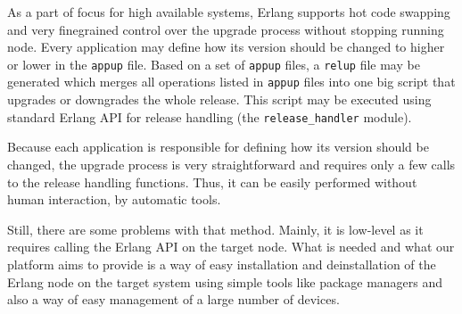 As a part of focus for high available systems, Erlang supports hot code swapping and
very finegrained control over the upgrade process without stopping running node.
Every application may define how its version should be changed to higher or lower in the
{\tt appup} file. Based on a set of {\tt appup} files, a {\tt relup} file may be generated
which merges all operations listed in {\tt appup} files into one big script that
upgrades or downgrades the whole release. This script may be executed using standard Erlang
API for release handling (the {\tt release\_handler} module).

Because each application is responsible
for defining how its version should be changed, the upgrade process is very straightforward
and requires only a few calls to the release handling functions. Thus, it can be easily
performed without human interaction, by automatic tools.

Still, there are some problems with that method. Mainly, it is low-level as it requires
calling the Erlang API on the target node. What is needed and what our platform aims to provide is
a way of easy installation and deinstallation of the Erlang node on the target system using
simple tools like package managers and also a way of easy management of a large number of devices.

